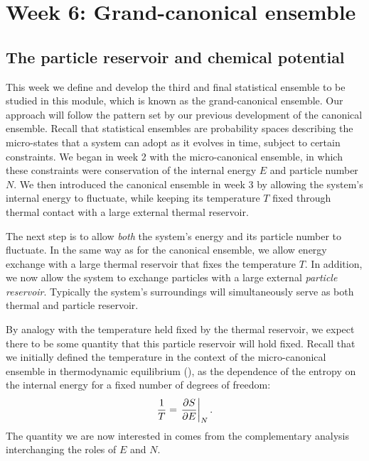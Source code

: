 \renewcommand{\thisweek}{MATH327 Week 6}
\renewcommand{\moddate}{Last modified 7 Mar.~2021}
\setcounter{section}{6}
\setcounter{subsection}{0}
{}
\section*{Week 6: Grand-canonical ensemble}
\subsection{The particle reservoir and chemical potential}
This week we define and develop the third and final statistical ensemble to be studied in this module, which is known as the grand-canonical ensemble.
Our approach will follow the pattern set by our previous development of the canonical ensemble.
Recall that statistical ensembles are probability spaces describing the micro-states that a system can adopt as it evolves in time, subject to certain constraints.
We began in week 2 with the micro-canonical ensemble, in which these constraints were conservation of the internal energy $E$ and particle number $N$.
We then introduced the canonical ensemble in week 3 by allowing the system's internal energy to fluctuate, while keeping its temperature $T$ fixed through thermal contact with a large external thermal reservoir.

The next step is to allow \textit{both} the system's energy and its particle number to fluctuate.
In the same way as for the canonical ensemble, we allow energy exchange with a large thermal reservoir that fixes the temperature $T$.
In addition, we now allow the system to exchange particles with a large external \textit{particle reservoir}.
Typically the system's surroundings will simultaneously serve as both thermal and particle reservoir.

By analogy with the temperature held fixed by the thermal reservoir, we expect there to be some quantity that this particle reservoir will hold fixed.
Recall that we initially defined the temperature in the context of the micro-canonical ensemble in thermodynamic equilibrium (), as the dependence of the entropy on the internal energy for a fixed number of degrees of freedom:
\begin{equation*}
  \frac{1}{T} = \left. \frac{\partial S}{\partial E}\right|_N.
\end{equation*}
The quantity we are now interested in comes from the complementary analysis interchanging the roles of $E$ and $N$.


